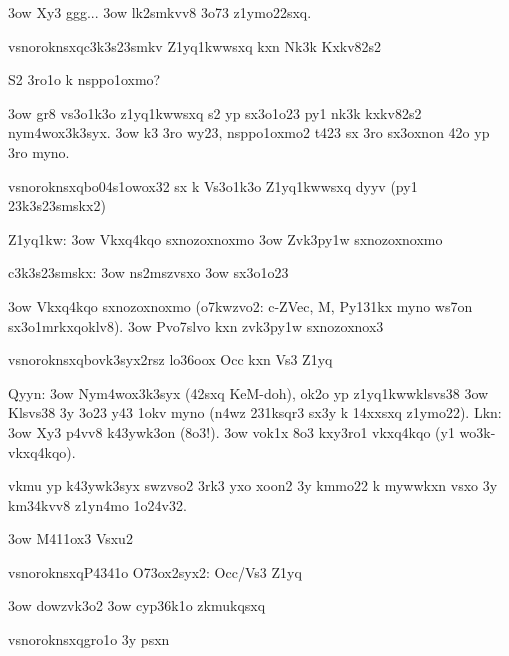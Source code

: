 \s3ow Xy3 ggg...
\s3ow lk2smkvv8 3o73 z1ymo22sxq.

  \2vsnoroknsxq{c3k3s23smkv Z1yq1kwwsxq kxn Nk3k Kxkv82s2}
  
  S2 3ro1o k nsppo1oxmo? 

\s3ow gr8 vs3o1k3o z1yq1kwwsxq s2 yp sx3o1o23 py1 nk3k kxkv82s2
  nym4wox3k3syx. 
\s3ow k3 3ro wy23, nsppo1oxmo2 t423 sx 3ro sx3oxnon 42o yp 3ro myno.


  \2vsnoroknsxq{bo04s1owox32 sx k Vs3o1k3o Z1yq1kwwsxq dyyv}
  (py1 23k3s23smskx2)

  Z1yq1kw:
  \s3ow Vkxq4kqo sxnozoxnoxmo 
  \s3ow Zvk3py1w sxnozoxnoxmo

  c3k3s23smskx:
  \s3ow ns2mszvsxo
  \s3ow sx3o1o23

\s3ow Vkxq4kqo sxnozoxnoxmo (o7kwzvo2: c-ZVec, M, Py131kx myno ws7on
  sx3o1mrkxqoklv8).
\s3ow Pvo7slvo kxn zvk3py1w sxnozoxnox3

  \2vsnoroknsxq{bovk3syx2rsz lo36oox Occ kxn Vs3 Z1yq}
  
  Qyyn:
  \s3ow Nym4wox3k3syx (42sxq KeM-doh), ok2o yp z1yq1kwwklsvs38
  \s3ow Klsvs38 3y 3o23 y43 1okv myno (n4wz 231ksqr3 sx3y k 14xxsxq
    z1ymo22).
  Lkn:
  \s3ow Xy3 p4vv8 k43ywk3on (8o3!).
  \s3ow vok1x 8o3 kxy3ro1 vkxq4kqo (y1 wo3k-vkxq4kqo).
  

vkmu yp k43ywk3syx swzvso2 3rk3 yxo xoon2 3y kmmo22 k mywwkxn vsxo 3y
km34kvv8 z1yn4mo 1o24v32.
 
\s3ow M411ox3 Vsxu2

  \2vsnoroknsxq{P4341o O73ox2syx2: Occ/Vs3 Z1yq}


\s3ow dowzvk3o2
\s3ow cyp36k1o zkmukqsxq

  \2vsnoroknsxq{gro1o 3y psxn}


